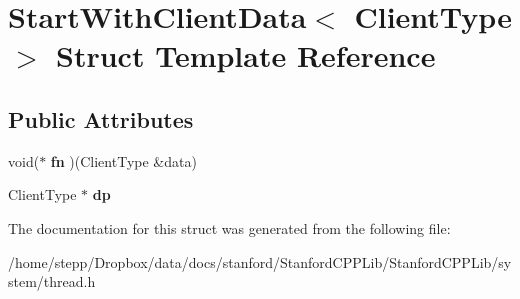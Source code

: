 \hypertarget{structStartWithClientData}{}\section{Start\+With\+Client\+Data$<$ Client\+Type $>$ Struct Template Reference}
\label{structStartWithClientData}
\subsection*{Public Attributes}
\begin{DoxyCompactItemize}
\item 
\mbox{\label{structStartWithClientData_a83583c6e733bf809465c02eaccbca4e5}} 
void($\ast$ {\bfseries fn} )(Client\+Type \&data)
\item 
\mbox{\label{structStartWithClientData_aee326c65490ae69daf96f070f8cd11d5}} 
Client\+Type $\ast$ {\bfseries dp}
\end{DoxyCompactItemize}


The documentation for this struct was generated from the following file\+:\begin{DoxyCompactItemize}
\item 
/home/stepp/\+Dropbox/data/docs/stanford/\+Stanford\+C\+P\+P\+Lib/\+Stanford\+C\+P\+P\+Lib/system/thread.\+h\end{DoxyCompactItemize}
